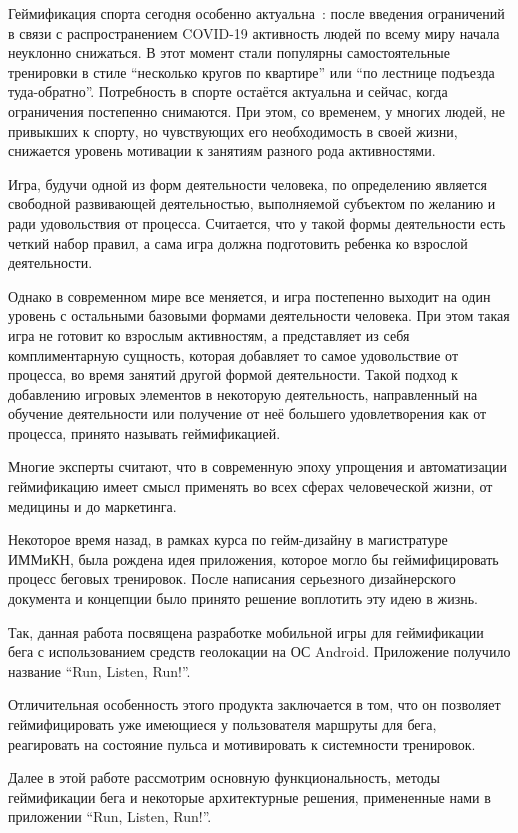 \Intro

Геймификация спорта сегодня особенно актуальна~\autocite{gamification}: после введения ограничений в связи с распространением COVID-19 активность людей по всему миру начала неуклонно снижаться. В этот момент стали популярны самостоятельные тренировки в стиле ``несколько кругов по квартире'' или ``по лестнице подъезда туда-обратно''. Потребность в спорте остаётся актуальна и сейчас, когда ограничения постепенно снимаются. При этом, со временем, у многих людей, не привыкших к спорту, но чувствующих его необходимость в своей жизни, снижается уровень мотивации к занятиям разного рода активностями. 

Игра, будучи одной из форм деятельности человека, по определению является свободной развивающей деятельностью, выполняемой субъектом по желанию и ради удовольствия от процесса. Считается, что у такой формы деятельности есть четкий набор правил, а сама игра должна подготовить ребенка ко взрослой деятельности.

Однако в современном мире все меняется, и игра постепенно выходит на один уровень с остальными базовыми формами деятельности человека. При этом такая игра не готовит ко взрослым активностям, а представляет из себя комплиментарную сущность, которая добавляет то самое удовольствие от процесса, во время занятий другой формой деятельности. Такой подход к добавлению игровых элементов в некоторую деятельность, направленный на обучение деятельности или получение от неё большего удовлетворения как от процесса, принято называть геймификацией.  

Многие эксперты считают, что в современную эпоху упрощения и автоматизации геймификацию имеет смысл применять во всех сферах человеческой жизни, от медицины и до маркетинга.

Некоторое время назад, в рамках курса по гейм-дизайну в магистратуре ИММиКН, была рождена идея приложения, которое могло бы геймифицировать процесс беговых тренировок. После написания серьезного дизайнерского документа и концепции было принято решение воплотить эту идею в жизнь.

Так, данная работа посвящена разработке мобильной игры для геймификации бега с использованием средств геолокации на ОС Android. Приложение получило название ``Run, Listen, Run!''.

Отличительная особенность этого продукта заключается в том, что он позволяет геймифицировать уже имеющиеся у пользователя маршруты для бега, реагировать на состояние пульса и мотивировать к системности тренировок.

Далее в этой работе рассмотрим основную функциональность, методы геймификации бега и некоторые архитектурные решения, примененные нами в приложении ``Run, Listen, Run!''.



